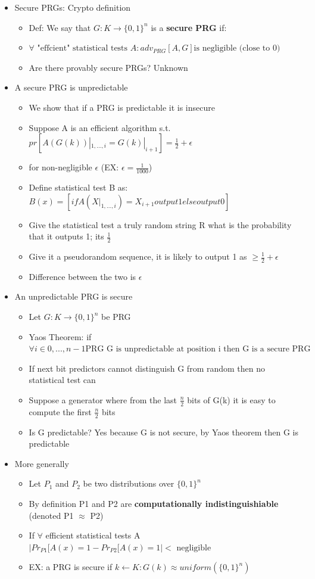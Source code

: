 \documentclass[]{article}
\begin{document}
\begin{itemize}
\begin{itemize}
	\end{itemize}
	\item Secure PRGs: Crypto definition
	\begin{itemize}
		\item Def: We say that $G:K \rightarrow \{0,1\}^{n}$ is a \textbf{secure PRG} if:
		\item $\forall \text{ "effcient" statistical tests } A: adv_{PRG}[A,G] \text{is negligible (close to 0)} $
		\item Are there provably secure PRGs? Unknown
	\end{itemize}
	\item A secure PRG is unpredictable
	\begin{itemize}
		\item We show that if a PRG is predictable it is insecure
		\item Suppose A is an efficient algorithm s.t. $pr[A(G(k)) |_{1,...,i} = G(k) |_{i+1}] = \frac{1}{2} + \epsilon$
		\item for non-negligible $\epsilon$ (EX: $\epsilon = \frac{1}{1000}$)
		\item Define statistical test B as: $B(x) = [if A(X |_{1,...,i}) = X_{i+1} output 1 else output 0]$
		\item Give the statistical test a truly random string R what is the probability that it outputs 1; its $\frac{1}{2}$
		\item Give it a pseudorandom sequence, it is likely to output 1 as $\geq \frac{1}{2} + \epsilon$
		\item Difference between the two is $\epsilon$
	\end{itemize}
	\item An unpredictable PRG is secure
	\begin{itemize}
		\item Let $G:K \rightarrow \{0,1\}^{n}$ be PRG
		\item Yaos Theorem: if $\forall i \in {0,...,n-1} \text{PRG G is unpredictable at position i then G is a secure PRG}$
		\item If next bit predictors cannot distinguish G from random then no statistical test can
		\item Suppose a generator where from the last $\frac{n}{2}$ bits of G(k) it is easy to compute the first $\frac{n}{2}$ bits
		\item Is G predictable? Yes because G is not secure, by Yaos theorem then G is predictable
	\end{itemize}
	\item More generally
	\begin{itemize}
		\item Let $P_{1}$ and $P_{2}$ be two distributions over $\{0,1\}^{n}$
		\item By definition P1 and P2 are \textbf{computationally indistinguishiable} (denoted P1 $\approx$ P2)
		\item If $\forall$ efficient statistical tests  A $|Pr_{P1}[A(x) = 1 - Pr_{P2}[A(x) = 1| < \text{ negligible }$
		\item EX: a PRG is secure if ${ k \leftarrow K: G(k)} \approx uniform(\{0,1\}^{n})$
	\end{itemize}
\end{itemize}
\end{document}
